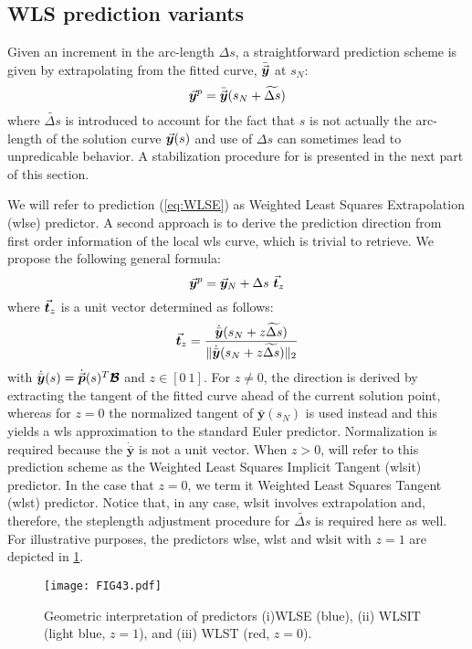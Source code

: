 \subsection{WLS prediction variants}\label{CH5-S2SS2}

Given an increment in the arc-length $\Delta s$, a straightforward prediction
scheme is given by extrapolating from the fitted curve, $\bar{\vec{\bm{y}}}$ at 
$s_N$:
\begin{equation}
	\vec{\bm{y}}^p = \bar{\vec{\bm{y}}}(s_N+\widetilde{\Delta s})
	\label{eq:WLSE}
\end{equation}
where $\widetilde{\Delta s}$ is introduced to account for the fact that $s$ is
not actually the arc-length of the solution curve $\vec{\bm{y}}(s)$ and use of 
$\Delta s$ can 
sometimes lead to unpredicable behavior. A stabilization procedure for is 
presented in the next part of this section. 

We will refer to prediction (\ref{eq:WLSE}) as Weighted Least Squares 
Extrapolation (\acrshort{wlse}) predictor. A second approach is to derive the 
prediction direction from first order
information of the local \acrshort{wls} curve, which is trivial to retrieve. We 
propose the following general formula:
\begin{equation}
	\vec{\bm{y}}^p = \vec{\bm{y}}_N + \Delta s\ \vec{\bm{t}}_z
	\label{eq:WLSIT}
\end{equation}
where $\vec{\bm{t}}_z$ is a unit vector determined as follows:
\begin{equation}
	\vec{\bm{t}}_z = \dfrac{\dot{\bar{\bm{y}}}(s_N+z\widetilde{\Delta
			s})}{\Vert\dot{\bar{\bm{y}}}(s_N+z\widetilde{\Delta s})\Vert_2}
	\label{eq:ImplicitTangent}
\end{equation}
with $\dot{\bar{\bm{y}}}(s)=\dot{\vec{\bm{p}}}(s)^T\bm{\mathcal{B}}$ and $z\in[0\ 
1]$. For
$z\neq 0$, the direction is derived by extracting the tangent of the fitted
curve ahead of the current solution point, whereas for $z=0$ the normalized 
tangent of $\bar{\bm{y}}(s_N)$ is used instead and this yields a
\acrshort{wls} approximation to the standard Euler predictor. Normalization is 
required
because the $\dot{\bar{\bm{y}}}$ is not a unit vector. When $z>0$, will refer to
this prediction scheme as the Weighted Least Squares Implicit Tangent 
(\acrshort{wlsit}) predictor. In the case that $z=0$, we term it Weighted Least 
Squares Tangent
(\acrshort{wlst}) predictor. Notice that, in any case, \acrshort{wlsit} 
involves extrapolation and,
therefore, the steplength adjustment procedure for $\widetilde{\Delta s}$ is
required here as well. For illustrative purposes, the predictors 
\acrshort{wlse}, \acrshort{wlst}
and \acrshort{wlsit} with $z=1$ are depicted in 
\ref{fig:DifferentialPredictors}.
\begin{figure}[t]
	\centering
	\texttt{[image: FIG43.pdf]}
	\caption{Geometric interpretation of predictors (i)WLSE (blue), (ii) WLSIT
		(light blue, $z=1$), and (iii) WLST (red, $z=0$).}
	\label{fig:DifferentialPredictors}
\end{figure}

